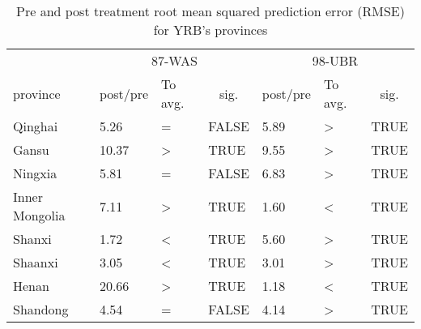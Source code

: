 
\begin{table}[!htbp]\footnotesize
	\centering
	\caption{Pre and post treatment root mean squared prediction error (RMSE) for YRB's provinces}\label{tab:DSC_summary}
	\begin{tabularx}{0.8\textwidth}{XXXXXXX}
	  \toprule
			& \multicolumn{3}{c}{87-WAS} & \multicolumn{3}{c}{98-UBR} \\
  \cmidrule{2-7}    province  & \multicolumn{1}{c}{post/pre} & To avg. & \multicolumn{1}{c}{sig.} & \multicolumn{1}{c}{post/pre} & To avg.   & \multicolumn{1}{c}{sig.} \\
	  \midrule
	  Qinghai & 5.26  & =     & FALSE & 5.89  & >     & TRUE \\
	  Gansu & 10.37  & >     & TRUE  & 9.55  & >     & TRUE \\
	  Ningxia & 5.81  & =     & FALSE & 6.83  & >     & TRUE \\
	  Inner Mongolia & 7.11  & >     & TRUE  & 1.60  & <     & TRUE \\
	  Shanxi & 1.72  & <     & TRUE  & 5.60  & >     & TRUE \\
	  Shaanxi & 3.05  & <     & TRUE  & 3.01  & >     & TRUE \\
	  Henan & 20.66  & >     & TRUE  & 1.18  & <     & TRUE \\
	  Shandong & 4.54  & =     & FALSE & 4.14  & >     & TRUE \\
	  \bottomrule
	  \end{tabularx}%
	\label{tab:addlabel}%
\end{table}%
